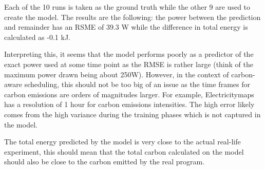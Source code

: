 Each of the 10 runs is taken as the ground truth while the other 9 are used to create the model. 
The results are the following: the power between the prediction and remainder has an RSME of 39.3 W while the difference in total energy is calculated as -0.1 kJ. 

Interpreting this, it seems that the model performs poorly as a predictor of the exact power used at some time point as the RMSE is rather large (think of the maximum power drawn being about 250W). 
However, in the context of carbon-aware scheduling, this should not be too big of an issue as the time frames for carbon emissions are orders of magnitudes larger. 
For example, Electricitymaps has a resolution of 1 hour for carbon emissions intensities. 
The high error likely comes from the high variance during the training phases which is not captured in the model.

The total energy predicted by the model is very close to the actual real-life experiment, this should mean that the total carbon calculated on the model should also be close to the carbon emitted by the real program.
